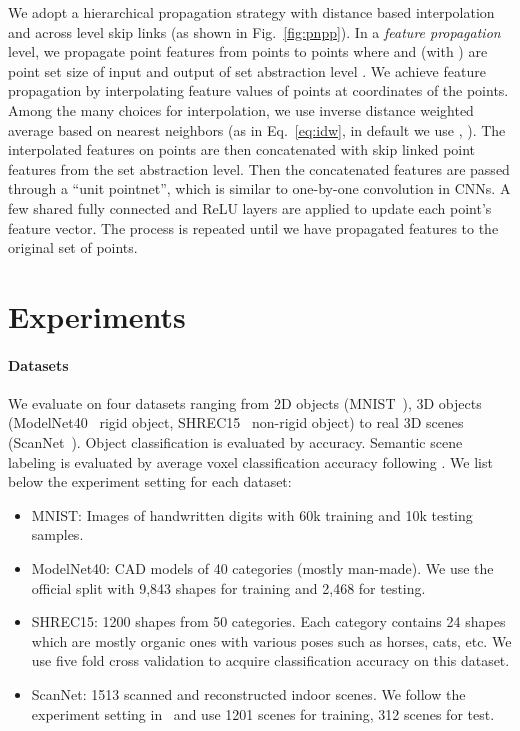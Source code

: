 \documentclass{article}
\begin{document}
We adopt a hierarchical propagation strategy with distance based interpolation and across level skip links (as shown in Fig.~\ref{fig:pnpp}). In a \emph{feature propagation} level, we propagate point features from  points to  points where  and  (with ) are point set size of input and output of set abstraction level . We achieve feature propagation by interpolating feature values  of  points at coordinates of the  points. Among the many choices for interpolation, we use inverse distance weighted average based on  nearest neighbors (as in Eq.~\ref{eq:idw}, in default we use , ). The interpolated features on  points are then concatenated with skip linked point features from the set abstraction level. Then the concatenated features are passed through a ``unit pointnet'', which is similar to one-by-one convolution in CNNs. A few shared fully connected and ReLU layers are applied to update each point's feature vector. The process is repeated until we have propagated features to the original set of points.

\vspace{-0.3cm}
 
\section{Experiments}
\label{sec:exp}

\vspace{-0.15cm}
\paragraph{Datasets} We evaluate on four datasets ranging from 2D objects (MNIST~\cite{lecun1998gradient}), 3D objects (ModelNet40~\cite{wu20153d} rigid object, SHREC15~\cite{3dor.20151064} non-rigid object) to real 3D scenes (ScanNet~\cite{dai2017scannet}). Object classification is evaluated by accuracy.
Semantic scene labeling is evaluated by average voxel classification accuracy following \cite{dai2017scannet}. We list below the experiment setting for each dataset:
\begin{itemize}
    \item MNIST: Images of handwritten digits with 60k training and 10k testing samples.
    \item ModelNet40: CAD models of 40 categories (mostly man-made). We use the official split with 9,843 shapes for training and 2,468 for testing.
    \item SHREC15: 1200 shapes from 50 categories. Each category contains 24 shapes which are mostly organic ones with various poses such as horses, cats, etc. We use five fold cross validation to acquire classification accuracy on this dataset.
\item ScanNet: 1513 scanned and reconstructed indoor scenes. We follow the experiment setting in~\cite{dai2017scannet} and use 1201 scenes for training, 312 scenes for test.
\end{itemize}
\end{document}
